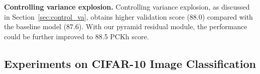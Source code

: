 \documentclass[10pt,twocolumn,letterpaper]{article}
\newcommand{\smalltitle}[1]{\vspace{0.2em}\noindent \textbf{{#1}}}
\begin{document}

\smalltitle{Controlling variance explosion.} 
Controlling variance explosion, as discussed in Section~\ref{sec:control_va}, obtains higher validation score (88.0) compared with the baseline model (87.6). With our pyramid residual module, the performance could be further improved to 88.5 PCKh score.


\subsection{Experiments on CIFAR-10 Image Classification}
\end{document}
